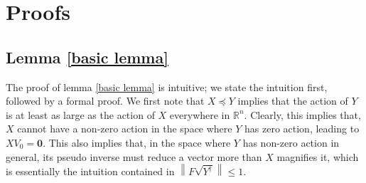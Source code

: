 \documentclass[11pt]{article}
\newcommand{\RR}{\mathbb{R}}
\newcommand{\norm}[1]{\left\|#1\right\|}
\newcommand{\Leq}{\preceq}
\newcommand{\0}{\ensuremath{\mathbf{0}}}
\renewcommand{\>}{\succ}
\newcommand{\<}{\prec}
\begin{document}
\section{Proofs}
\subsection{Lemma \ref{basic lemma}}
The proof of lemma \ref{basic lemma} is intuitive; we state the intuition first, followed by a formal proof. We first note that $X \Leq Y$ implies that the action of $Y$ is at least as large as the action of $X$ everywhere in $\RR^n$. Clearly, this implies that, $X$ cannot have a non-zero action in the space where $Y$ has zero action, leading to $X V_0 = \0$. This also implies that, in the space where $Y$ has non-zero action in general, its pseudo inverse must reduce a vector more than $X$ magnifies it, which is essentially the intuition contained in $\norm{F \sqrt{Y^{\dagger}} } \leq 1$. 
\end{document}
